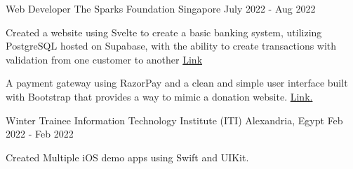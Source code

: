 \begin{cventries}
    
    \cventry
    {Web Developer} %
    {The Sparks Foundation} %
    {Singapore} %
    {July 2022 - Aug 2022} %
    {
      \begin{cvitems} %
        \item {Created a website using Svelte to create a basic banking system, utilizing PostgreSQL hosted on Supabase, with the ability to create transactions with validation from one customer to another \textcolor{link}{\href{https://tsf-intern.vercel.app/}{Link}}}
        \item {A payment gateway using RazorPay and a clean and simple user interface built with Bootstrap that provides a way to mimic a donation website. \textcolor{link}{\href{https://tsf-intern2.vercel.app}{Link.}}}
      \end{cvitems}
    }
    
   

    \cventry
    {Winter Trainee} %
    {Information Technology Institute (ITI)} %
    {Alexandria, Egypt} %
    {Feb 2022 - Feb 2022} %
    {
      \begin{cvitems} %
        \item {Created Multiple iOS demo apps using Swift and UIKit.}
      \end{cvitems}
    }
    
   
\end{cventries}
